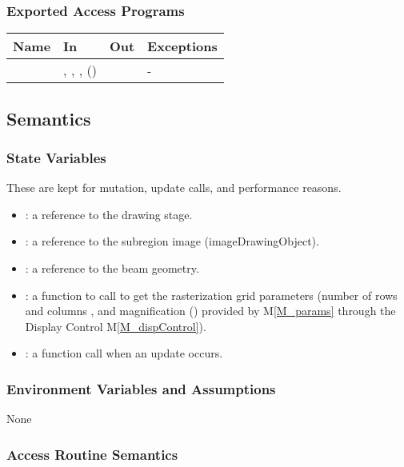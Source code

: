 \documentclass[12pt, titlepage]{article}
\newcommand{\mref}[1]{M\ref{#1}}
\begin{document}
\subsubsection{Exported Access Programs}

\begin{center}
\begin{tabular}{L{4cm} L{4cm} L{4cm} L{2cm}}
\hline
\textbf{Name} & \textbf{In} & \textbf{Out} & \textbf{Exceptions} \\
\hline
{} & , , ,
   ()
  &  & - \\
\hline
\end{tabular}
\end{center}

\subsection{Semantics}

\subsubsection{State Variables}
These are kept for mutation, update calls, and performance reasons.
\begin{itemize}
  \item {}: a reference to the drawing stage.
  \item {}: a reference to the subregion image (imageDrawingObject).
  \item {}: a reference to the beam geometry.
  \item {}: a function to call to get the rasterization
    grid parameters (number of rows  and columns ,
    and magnification () 
    provided by \mref{M_params}
    through the Display Control \mref{M_dispControl}).
  \item {}: a function call when an update occurs.
\end{itemize}

\subsubsection{Environment Variables and Assumptions}
None

\subsubsection{Access Routine Semantics}
\end{document}

